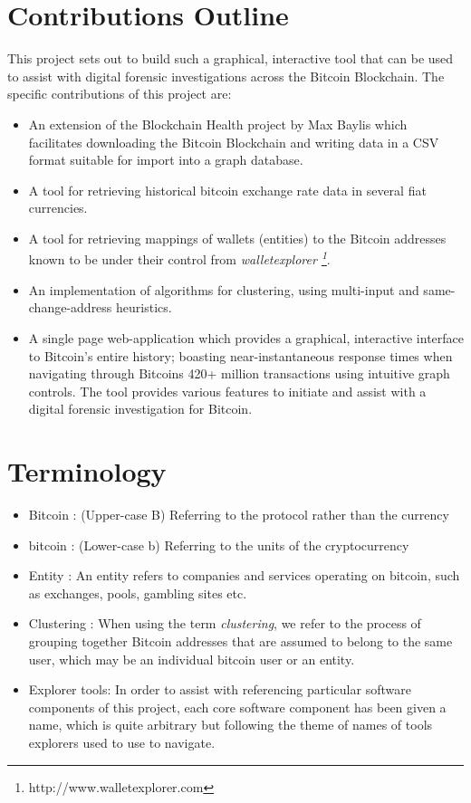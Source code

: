 \section{Contributions Outline}
This project sets out to build such a graphical, interactive tool that can be used to assist with digital forensic investigations across the Bitcoin Blockchain. The specific contributions of this project are:
\begin{itemize}
    \item An extension of the Blockchain Health project by Max Baylis which facilitates downloading the Bitcoin Blockchain and writing data in a CSV format suitable for import into a graph database.
    \item A tool for retrieving historical bitcoin exchange rate data in several fiat currencies.
    \item A tool for retrieving mappings of wallets (entities) to the Bitcoin addresses known to be under their control from \textit{walletexplorer \footnote{http://www.walletexplorer.com}}.
    \item An implementation of algorithms for clustering, using multi-input and same-change-address heuristics.
    \item A single page web-application which provides a graphical, interactive interface to Bitcoin's entire history; boasting near-instantaneous response times when navigating through Bitcoins 420+ million transactions \cite{RefWorks:doc:5cfba9cde4b0b8ab9a52e35c} using intuitive graph controls. The tool provides various features to initiate and assist with a digital forensic investigation for Bitcoin.
\end{itemize}


\section{Terminology}
\begin{itemize}
    \item Bitcoin : (Upper-case B) Referring to the protocol rather than the currency
    \item bitcoin : (Lower-case b) Referring to the units of the cryptocurrency
    \item Entity : An entity refers to companies and services operating on bitcoin, such as exchanges, pools, gambling sites etc. 
    \item Clustering : When using the term \textit{clustering}, we refer to the process of grouping together Bitcoin addresses that are assumed to belong to the same user, which may be an individual bitcoin user or an entity. 
    \item Explorer tools: In order to assist with referencing particular software components of this project, each core software component has been given a name, which is quite arbitrary but following the theme of names of tools explorers used to use to navigate.
 \end{itemize}
 
